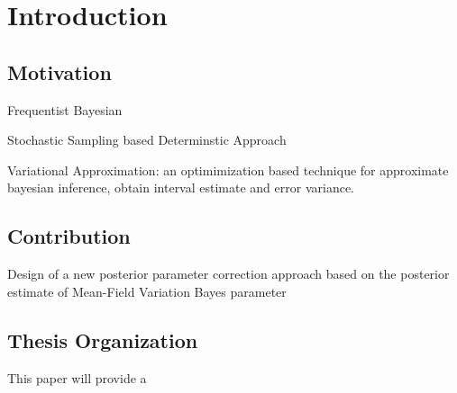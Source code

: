 \chapter{Introduction}
\label{Chapter1}
\section{Motivation}
Frequentist
Bayesian

Stochastic Sampling based
Determinstic Approach

Variational Approximation: an optimimization based technique for approximate bayesian inference, obtain interval estimate and error variance.


\section{Contribution}
Design of a new posterior parameter correction approach based on the posterior estimate of Mean-Field Variation Bayes parameter


\section{Thesis Organization}
This paper will provide a  




 